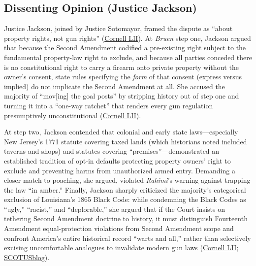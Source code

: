 \documentclass[12pt]{article}
\begin{document}
\subsection{Dissenting Opinion (Justice Jackson)}
Justice Jackson, joined by Justice Sotomayor, framed the dispute as ``about property rights, not gun rights'' (\href{https://www.law.cornell.edu/supremecourt/text/24-1046}{Cornell LII}). At \textit{Bruen} step one, Jackson argued that because the Second Amendment codified a pre-existing right subject to the fundamental property-law right to exclude, and because all parties conceded there is no constitutional right to carry a firearm onto private property without the owner's consent, state rules specifying the \textit{form} of that consent (express versus implied) do not implicate the Second Amendment at all. She accused the majority of ``mov[ing] the goal posts'' by stripping history out of step one and turning it into a ``one-way ratchet'' that renders every gun regulation presumptively unconstitutional (\href{https://www.law.cornell.edu/supremecourt/text/24-1046}{Cornell LII}).

At step two, Jackson contended that colonial and early state laws---especially New Jersey's 1771 statute covering taxed lands (which historians noted included taverns and shops) and statutes covering ``premises''---demonstrated an established tradition of opt-in defaults protecting property owners' right to exclude and preventing harms from unauthorized armed entry. Demanding a closer match to poaching, she argued, violated \textit{Rahimi}'s warning against trapping the law ``in amber.'' Finally, Jackson sharply criticized the majority's categorical exclusion of Louisiana's 1865 Black Code: while condemning the Black Codes as ``ugly,'' ``racist,'' and ``deplorable,'' she argued that if the Court insists on tethering Second Amendment doctrine to history, it must distinguish Fourteenth Amendment equal-protection violations from Second Amendment scope and confront America's entire historical record ``warts and all,'' rather than selectively excising uncomfortable analogues to invalidate modern gun laws (\href{https://www.law.cornell.edu/supremecourt/text/24-1046}{Cornell LII}; \href{https://www.scotusblog.com/2026/06/supreme-court-strikes-hawaii-gun-restriction/}{SCOTUSblog}).
\end{document}

